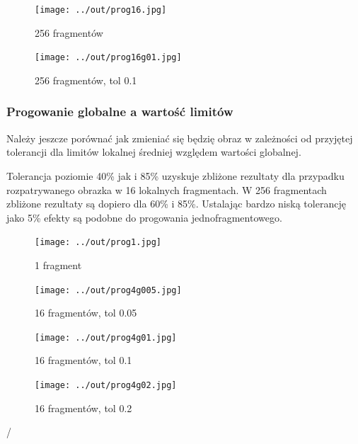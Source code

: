 \documentclass[a4paper,12pt]{article}
\begin{document}
\begin{figure}[h!]
\begin{minipage}[t]{7.5cm}
\begin{center}
\texttt{[image: ../out/prog16.jpg]}
\caption{256 fragmentów}
\end{center}
\end{minipage}
\hfill
\begin{minipage}[t]{7.5cm}
\begin{center}
\texttt{[image: ../out/prog16g01.jpg]}
\caption{256 fragmentów, tol 0.1}
\end{center}
\end{minipage}
\end{figure}


\newpage
\subsubsection{Progowanie globalne a wartość limitów}

Należy jeszcze porównać jak zmieniać się będzię obraz w zależności od przyjętej tolerancji dla limitów lokalnej średniej względem wartości globalnej.


Tolerancja poziomie 40\% jak i 85\% uzyskuje zbliżone rezultaty dla przypadku rozpatrywanego obrazka w 16 lokalnych fragmentach. W 256 fragmentach zbliżone rezultaty są dopiero dla 60\% i 85\%. Ustalając bardzo niską tolerancję jako 5\% efekty są podobne do progowania jednofragmentowego. 

\begin{figure}[h!]
\begin{minipage}[t]{6.5cm}
\begin{center}
\texttt{[image: ../out/prog1.jpg]}
\caption{1 fragment}
\end{center}
\end{minipage}
\hfill
\begin{minipage}[t]{6.5cm}
\begin{center}
\texttt{[image: ../out/prog4g005.jpg]}
\caption{16 fragmentów, tol 0.05}
\end{center}
\end{minipage}
\end{figure}

\begin{figure}[h!]
\begin{minipage}[t]{6.5cm}
\begin{center}
\texttt{[image: ../out/prog4g01.jpg]}
\caption{16 fragmentów, tol 0.1}
\end{center}
\end{minipage}
\hfill
\begin{minipage}[t]{6.5cm}
\begin{center}
\texttt{[image: ../out/prog4g02.jpg]}
\caption{16 fragmentów, tol 0.2}
\end{center}
\end{minipage}
\end{figure}/
\end{document}

